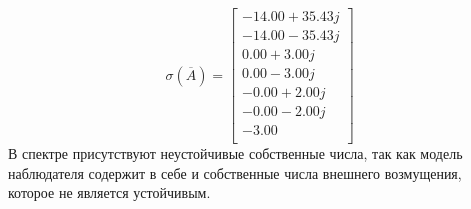 \begin{equation}
    \sigma(\overline{A}) = \begin{bmatrix}
        -14.00 + 35.43j \\ 
        -14.00 - 35.43j \\ 
        0.00 + 3.00j \\ 
        0.00 - 3.00j \\ 
        -0.00 + 2.00j \\ 
        -0.00 - 2.00j \\ 
        -3.00 \\ 
    \end{bmatrix}
\end{equation}
В спектре присутствуют неустойчивые собственные числа, так как модель наблюдателя 
содержит в себе и собственные числа внешнего возмущения, которое не является устойчивым. 

